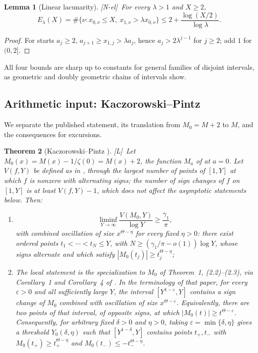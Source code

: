 \documentclass[11pt]{amsart}
\numberwithin{equation}{section}
\theoremstyle{plain}
\newtheorem{theorem}{Theorem}[section]
\newtheorem{lemma}[theorem]{Lemma}
\theoremstyle{definition}
\theoremstyle{remark}
\newcommand{\tagNE}{\textup{[N-el]}}
\newcommand{\tagL}{\textup{[L]}}
\begin{document}
\begin{lemma}[Linear lacunarity]
\label{lem:linear-lacunary}
\tagNE\ For every $\lambda>1$ and $X\ge2$,
\begin{equation}
\label{eq:linear-lacunary-count}
E_\lambda(X)=\#\{\nu:x_{0,\nu}\le X,\ x_{1,\nu}>\lambda x_{0,\nu}\}
\le2+\frac{\log(X/2)}{\log\lambda}.
\end{equation}
\end{lemma}

\begin{proof}
For starts $a_j\ge2$, $a_{j+1}\ge x_{1,j}>\lambda a_j$, hence
$a_j>2\lambda^{j-1}$ for $j\ge2$; add $1$ for $(0,2]$.
\end{proof}

All four bounds are sharp up to constants for general families of disjoint
intervals, as geometric and doubly geometric chains of intervals show.

\subsection{Arithmetic input: Kaczorowski--Pintz}

We separate the published statement, its translation from $M_0=M+2$ to
$M$, and the consequences for excursions.

\begin{theorem}[Kaczorowski--Pintz {\cite{KP86}}]
\label{thm:KP-quoted}
\tagL\ Let $M_0(x)=M(x)-1/\zeta(0)=M(x)+2$, the function $M_a$ of \cite{KP86} at
$a=0$. Let $V(f,Y)$ be defined as in \cite{KP86}, through the largest number of
points of $[1,Y]$ at which $f$ is nonzero with alternating signs; the number
of sign changes of $f$ on $[1,Y]$ is at least $V(f,Y)-1$, which does not
affect the asymptotic statements below. Then:
\begin{enumerate}[label=\textup{(\roman*)}]
\item \cite[Corollary~4, p.~178, (2.13)--(2.15)]{KP86}
\begin{equation}
\label{eq:KP-signchanges}
\liminf_{Y\to\infty}\frac{V(M_0,Y)}{\log Y}\ge\frac{\gamma_1}{\pi},
\end{equation}
with combined oscillation of size $x^{\Theta-\eta}$ for every fixed
$\eta>0$: there exist ordered points $t_1<\cdots<t_N\le Y$, with
$N\ge(\gamma_1/\pi-o(1))\log Y$, whose signs alternate and which satisfy
$|M_0(t_j)|\ge t_j^{\Theta-\eta}$;
\item The local statement is the specialization to $M_0$ of
Theorem~1, (2.2)--(2.3), via Corollary~1 and Corollary~4 of \cite{KP86}.
In the terminology of that paper, for every $\varepsilon>0$ and all
sufficiently large $Y$, the interval $[Y^{1-\varepsilon},Y]$ contains a
sign change of $M_0$ combined with oscillation of size
$x^{\Theta-\varepsilon}$.  Equivalently, there are two points of that
interval, of opposite signs, at which
$|M_0(t)|\ge t^{\Theta-\varepsilon}$.  Consequently, for arbitrary fixed
$\delta>0$ and $\eta>0$, taking
$\varepsilon=\min\{\delta,\eta\}$ gives a threshold
$Y_0(\delta,\eta)$ such that $[Y^{1-\delta},Y]$ contains points $t_+,t_-$
with
$M_0(t_+)\ge t_+^{\Theta-\eta}$ and
$M_0(t_-)\le-t_-^{\Theta-\eta}$.
\end{enumerate}
\end{theorem}
\end{document}
